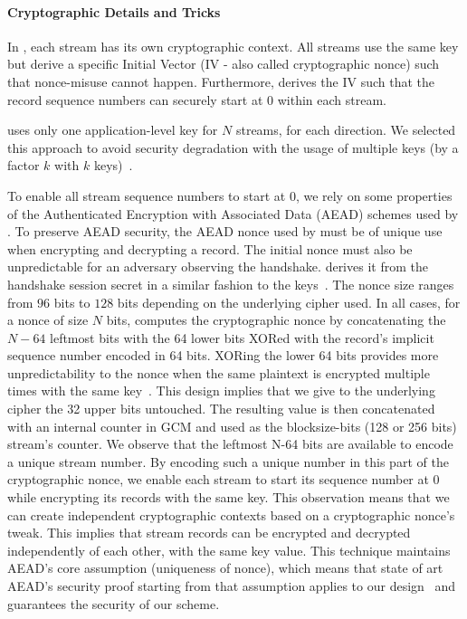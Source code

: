 \paragraph*{Cryptographic Details and Tricks} In \tcpls, each stream has its own
cryptographic context. All streams use the same key but derive a specific
Initial Vector (IV - also called cryptographic nonce) such that nonce-misuse
cannot happen. Furthermore, \tcpls derives the IV such that the record sequence
numbers can securely start at $0$ within each stream.

\tcpls uses only one application-level key for $N$ streams, for each direction.
We selected this approach to avoid security degradation with the usage of
multiple keys (by a factor $k$ with $k$ keys)~\cite{chatterjee2011another}.

To enable all stream sequence numbers to start at 0, we rely on some properties
of the Authenticated Encryption with Associated Data (AEAD) schemes used by . To preserve AEAD security, the AEAD nonce used by \tcpls must be of unique
use when encrypting and decrypting a record. The initial nonce must also be
unpredictable for an adversary observing the handshake. \tcpls derives it from
the \tls handshake session secret in a similar fashion to the \tls
keys~\cite{rfc8446}. The nonce size ranges from $96$ bits to $128$ bits
depending on the underlying cipher used. In all cases, for a nonce of size $N$
bits, \tls computes the cryptographic nonce by concatenating the $N-64$ leftmost
bits with the 64 lower bits XORed with the record's implicit sequence number
encoded in 64 bits. XORing the lower 64 bits provides more unpredictability to
the nonce when the same plaintext is encrypted multiple times with the same
key~\cite{bellare2016multi,hoang2018multi}. This design implies that we give to
the underlying cipher the 32 upper bits untouched. The resulting value is then
concatenated with an internal counter in GCM and used as the blocksize-bits (128
or 256 bits) stream's counter.
We observe that the leftmost N-64 bits are available to encode a unique stream number. By
encoding such a unique number in this part of the cryptographic nonce, we enable
each stream to start its sequence number at 0 while encrypting its records with
the same key. This observation means that we can create independent
cryptographic contexts based on a cryptographic nonce's tweak. This implies
that stream records can be encrypted and decrypted independently of each other,
with the same key value. This technique maintains AEAD's core assumption
(uniqueness of nonce), which means that state of art AEAD's security proof
starting from that assumption applies to our
design~\cite{chatterjee2011another} and guarantees the security of our scheme.

